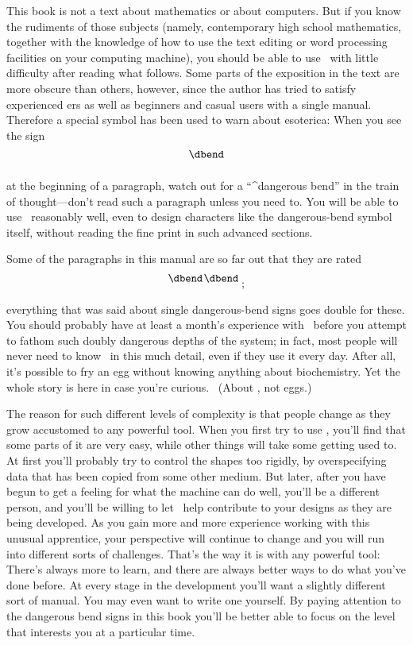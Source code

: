 {This book is not a text about mathematics or about computers. But if
you know the rudiments of those subjects (namely, contemporary high school
mathematics, together with the knowledge of how to use the text
editing or word processing facilities on your computing machine),
you should be able to use \MF\ with little difficulty after reading
what follows. Some parts of the exposition in the text are more obscure
than others, however, since the author has tried to satisfy experienced
\MF ers as well as beginners and casual users with a single manual.
Therefore a special symbol has been used to warn about esoterica: When you
see the sign
$$\vbox{\hbox{\dbend}\vskip 11pt}$$
at the beginning of a paragraph, watch out for a ``^{dangerous bend}''
in the train of thought---don't read such a paragraph unless you need to.
You will be able to use \MF\ reasonably well, even to design characters like
the dangerous-bend symbol itself, without reading the fine print in such
advanced sections.

Some of the paragraphs in this manual are so far out that they are rated
$$\vcenter{\hbox{\dbend\kern1pt\dbend}\vskip 11pt}\;;$$
everything that was said about single dangerous-bend signs goes double
for these. You should probably have at least a month's experience with
\MF\ before you attempt to fathom such doubly dangerous depths
of the system; in fact, most people will never need to know \MF\
in this much detail, even if they use it every day. After all, it's
possible to fry an egg without knowing anything about biochemistry.
Yet the whole story is here in case you're curious. \ (About \MF\!, not eggs.)

The reason for such different levels of complexity is that people change
as they grow accustomed to any powerful tool. When you first try to use
\MF\!, you'll find that some parts of it are very easy, while other things
will take some getting used to. At first you'll probably try to control
the shapes too rigidly, by overspecifying data that has been copied from
some other medium.  But later, after you have begun to get a feeling for
what the machine can do well, you'll be a different person, and you'll be
willing to let \MF\ help contribute to your designs as they are being
developed. As you gain more and more experience working with this unusual
apprentice, your perspective will continue to change and you will
run into different sorts of challenges.  That's the way it is with any
powerful tool: There's always more to learn, and there are always better
ways to do what you've done before.  At every stage in the development
you'll want a slightly different sort of manual.  You may even want to
write one yourself.  By paying attention to the dangerous bend signs in
this book you'll be better able to focus on the level that interests you
at a particular time.

}
